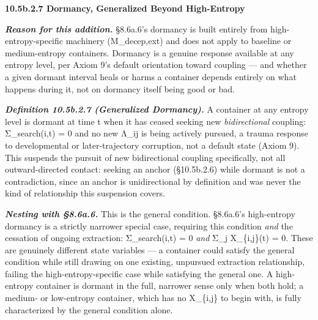 \documentclass[
]{article}
\begin{document}
\textbf{10.5b.2.7 Dormancy, Generalized Beyond High-Entropy}

\emph{\textbf{Reason for this addition.}} §8.6a.6's dormancy is built
entirely from high-entropy-specific machinery (M\_decep,ext) and does
not apply to baseline or medium-entropy containers. Dormancy is a
genuine response available at any entropy level, per Axiom 9's default
orientation toward coupling --- and whether a given dormant interval
heals or harms a container depends entirely on what happens during it,
not on dormancy itself being good or bad.

\emph{\textbf{Definition 10.5b.2.7 (Generalized Dormancy).}} A container
at any entropy level is dormant at time t when it has ceased seeking new
\emph{bidirectional} coupling: Σ\_search(i,t) = 0 and no new Λ\_ij is
being actively pursued, a trauma response to developmental or
later-trajectory corruption, not a default state (Axiom 9). This
suspends the pursuit of new bidirectional coupling specifically, not all
outward-directed contact: seeking an anchor (§10.5b.2.6) while dormant
is not a contradiction, since an anchor is unidirectional by definition
and was never the kind of relationship this suspension covers.

\emph{\textbf{Nesting with §8.6a.6.}} This is the general condition.
§8.6a.6's high-entropy dormancy is a strictly narrower special case,
requiring this condition \emph{and} the cessation of ongoing extraction:
Σ\_search(i,t) = 0 \emph{and} Σ\_j X\_\{i,j\}(t) = 0. These are
genuinely different state variables --- a container could satisfy the
general condition while still drawing on one existing, unpursued
extraction relationship, failing the high-entropy-specific case while
satisfying the general one. A high-entropy container is dormant in the
full, narrower sense only when both hold; a medium- or low-entropy
container, which has no X\_\{i,j\} to begin with, is fully characterized
by the general condition alone.
\end{document}
